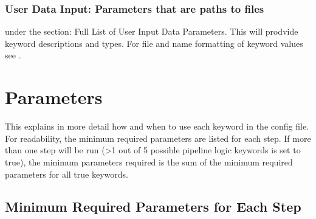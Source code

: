 \documentclass[letterpaper,10pt,english]{sphinxmanual}
\begin{document}
\begin{sphinxVerbatim}[commandchars=\\\{\}]
\end{sphinxVerbatim}


\subsubsection{User Data Input: Parameters that are paths to files}
\label{\detokenize{decipheringConfig:user-data-input-parameters-that-are-paths-to-files}}



{\hyperref[\detokenize{parameters::doc}]{}} under the section: Full List of User Input Data Parameters.  This will prodvide keyword descriptions and types.  For file and name formatting of keyword values see {\hyperref[\detokenize{fileFormats::doc}]{}}.




\section{Parameters}
\label{\detokenize{parameters:parameters}}\label{\detokenize{parameters::doc}}
This explains in more detail how and when to use each keyword in the config file.  For readability, the minimum required parameters are listed for each step.  If more than one step will be run (\textgreater{}1 out of 5 possible pipeline logic keywords is set to true), the minimum parameters required is the sum of the minimum required parameters for all true keywords.


\subsection{Minimum Required Parameters for Each Step}
\label{\detokenize{parameters:minimum-required-parameters-for-each-step}}
\end{document}
